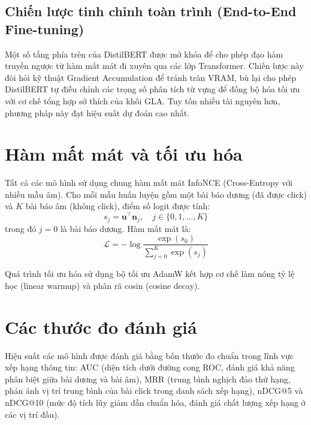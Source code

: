 \documentclass[../BTL.tex]{subfiles}
\begin{document}
\subsection{Chiến lược tinh chỉnh toàn trình (End-to-End Fine-tuning)}

Một số tầng phía trên của DistilBERT được mở khóa để cho phép đạo hàm truyền ngược từ hàm mất mát đi xuyên qua các lớp Transformer. Chiến lược này đòi hỏi kỹ thuật Gradient Accumulation để tránh tràn VRAM, bù lại cho phép DistilBERT tự điều chỉnh các trọng số phân tích từ vựng để đồng bộ hóa tối ưu với cơ chế tổng hợp sở thích của khối GLA. Tuy tốn nhiều tài nguyên hơn, phương pháp này đạt hiệu suất dự đoán cao nhất.

\section{Hàm mất mát và tối ưu hóa}

Tất cả các mô hình sử dụng chung hàm mất mát InfoNCE (Cross-Entropy với nhiều mẫu âm). Cho mỗi mẫu huấn luyện gồm một bài báo dương (đã được click) và $K$ bài báo âm (không click), điểm số logit được tính:
\begin{equation}
    s_j = \mathbf{u}^{\top} \mathbf{n}_j, \quad j \in \{0, 1, \ldots, K\}
\end{equation}
trong đó $j=0$ là bài báo dương. Hàm mất mát là:
\begin{equation}
    \mathcal{L} = -\log \frac{\exp(s_0)}{\sum_{j=0}^{K} \exp(s_j)}
\end{equation}

Quá trình tối ưu hóa sử dụng bộ tối ưu AdamW \cite{loshchilov2019adamw} kết hợp cơ chế làm nóng tỷ lệ học (linear warmup) và phân rã cosin (cosine decay).

\section{Các thước đo đánh giá}

Hiệu suất các mô hình được đánh giá bằng bốn thước đo chuẩn trong lĩnh vực xếp hạng thông tin: AUC (diện tích dưới đường cong ROC, đánh giá khả năng phân biệt giữa bài dương và bài âm), MRR (trung bình nghịch đảo thứ hạng, phản ánh vị trí trung bình của bài click trong danh sách xếp hạng), nDCG@5 và nDCG@10 (mức độ tích lũy giảm dần chuẩn hóa, đánh giá chất lượng xếp hạng ở các vị trí đầu).
\end{document}
